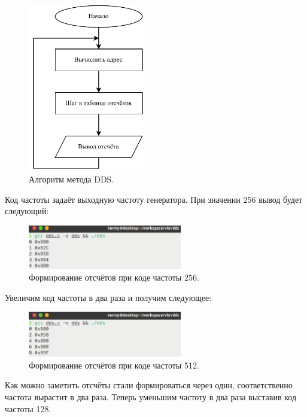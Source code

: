 \begin{figure}[H]
    \centering
    \includegraphics[width=0.45\textwidth]{../image/dds_block.pdf}
    \caption{Алгоритм метода DDS.}
\end{figure}
	
	Код частоты задаёт выходную частоту генератора. При значении 256 вывод будет следующий:
	
\begin{figure}[H]
    \centering
    \includegraphics[width=0.6\textwidth]{../image/dds256.png}
    \caption{Формирование отсчётов при коде частоты 256.}
\end{figure}
	
	Увеличим код частоты в два раза и получим следующее:

\begin{figure}[H]
    \centering
    \includegraphics[width=0.6\textwidth]{../image/dds512.png}
    \caption{Формирование отсчётов при коде частоты 512.}
\end{figure}

	Как можно заметить отсчёты стали формироваться через один, соответственно частота вырастит в два раза. Теперь уменьшим частоту в два раза выставив код частоты 128.

